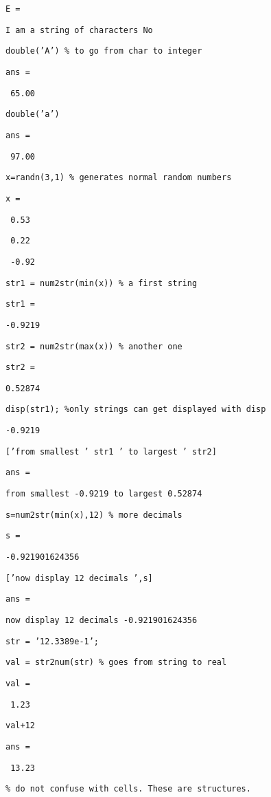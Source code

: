 \documentclass[12pt,a4paper]{article}
\begin{document}
\texttt{E =}

\texttt{I am a string of characters No}

\texttt{double('A') \% to go from char to integer}

\texttt{ans =}

\texttt{\ 65.00}

\texttt{double('a')}

\texttt{ans =}

\texttt{\ 97.00}

\texttt{x=randn(3,1) \% generates normal random numbers}

\texttt{x =}

\texttt{\ 0.53}

\texttt{\ 0.22}

\texttt{\ -0.92}

\texttt{str1 = num2str(min(x)) \% a first string}

\texttt{str1 =}

\texttt{-0.9219}

\texttt{str2 = num2str(max(x)) \% another one}

\texttt{str2 =}

\texttt{0.52874}

\texttt{disp(str1); \%only strings can get displayed with disp}

\texttt{-0.9219}

\texttt{['from smallest ' str1 ' to largest ' str2] }

\texttt{ans =}

\texttt{from smallest -0.9219 to largest 0.52874}

\texttt{s=num2str(min(x),12) \% more decimals}

\texttt{s =}

\texttt{-0.921901624356}

\texttt{['now display 12 decimals ',s]}

\texttt{ans =}

\texttt{now display 12 decimals -0.921901624356}

\texttt{str = '12.3389e-1';}

\texttt{val = str2num(str) \% goes from string to real}

\texttt{val =}

\texttt{\ 1.23}

\texttt{val+12}

\texttt{ans =}

\texttt{\ 13.23}

\texttt{\% do not confuse with cells. These are structures.}
\end{document}
